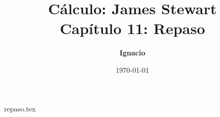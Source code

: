 \documentclass[11pt,spanish,oneside]{report}
\title{\textbf{Cálculo: James Stewart} \\ \Large Capítulo 11: Repaso}
\author{\textbf{Ignacio}}
\date{\today}
\begin{document}
\maketitle

{repaso.tex}
\end{document}
